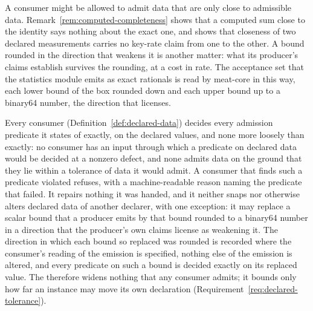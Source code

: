 
A consumer might be allowed to admit data that are only close to admissible
data. Remark~\ref{rem:computed-completeness} shows that a computed sum close to
the identity says nothing about the exact one, and
 shows that closeness of two declared
measurements carries no key-rate claim from one to the other. A bound rounded
in the direction that weakens it is another matter: what its producer's claims
establish survives the rounding, at a cost in rate. The acceptance set that
the statistics module emits as exact rationals is read by meat-core in this
way, each lower bound of the box rounded down and each upper bound up to a
binary64 number, the direction that  licenses.

\begin{requirement}\label{req:consumer-decides-exactly}
Every consumer (Definition~\ref{def:declared-data}) decides every admission
predicate it states of  exactly, on the declared values,
and none
more loosely than exactly: no consumer has an input through which a predicate
on declared data would be decided at a nonzero defect, and none admits data on
the ground that they lie within a tolerance of data it would admit. A consumer
that finds such a predicate violated refuses, with a machine-readable reason
naming the predicate that failed. It repairs nothing it was handed, and it
neither snaps nor otherwise alters declared data of another declarer, with one
exception: it may replace a scalar bound that a producer emits by that bound
rounded to a binary64 number in a direction that the producer's own claims
license as weakening it. The direction in which each bound so replaced was
rounded is recorded where the consumer's reading of the emission is
specified, nothing else of the emission is altered, and every predicate on
such a bound is decided exactly on its replaced value. The
 therefore widens nothing that any consumer admits;
it bounds only how far an instance may move its own declaration
(Requirement~\ref{req:declared-tolerance}).
\end{requirement}

